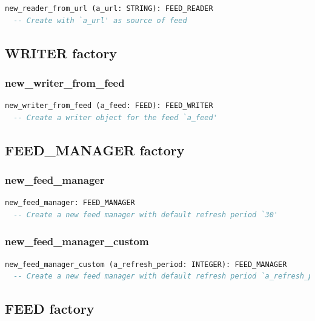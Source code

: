 \begin{lstlisting}[language=Eiffel]
new_reader_from_url (a_url: STRING): FEED_READER
  -- Create with `a_url' as source of feed
\end{lstlisting}


\subsection{WRITER factory}
\label{sec:syndication-factory-writer}

\subsubsection{new\_writer\_from\_feed}

\begin{lstlisting}[language=Eiffel]
new_writer_from_feed (a_feed: FEED): FEED_WRITER
  -- Create a writer object for the feed `a_feed'
\end{lstlisting}


\subsection{FEED\_MANAGER factory}
\label{sec:syndication-factory-feed-manager}

\subsubsection{new\_feed\_manager}

\begin{lstlisting}[language=Eiffel]
new_feed_manager: FEED_MANAGER
  -- Create a new feed manager with default refresh period `30'
\end{lstlisting}


\subsubsection{new\_feed\_manager\_custom}

\begin{lstlisting}[language=Eiffel]
new_feed_manager_custom (a_refresh_period: INTEGER): FEED_MANAGER
  -- Create a new feed manager with default refresh period `a_refresh_period'
\end{lstlisting}


\subsection{FEED factory}
\label{sec:syndication-factory-feed}

